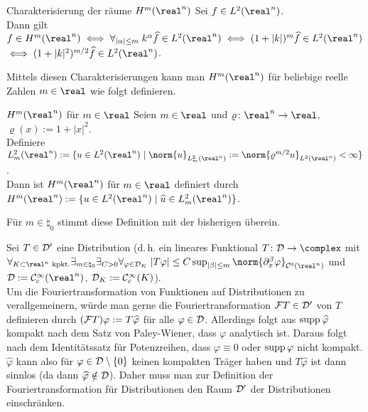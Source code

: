 \linie

\begin{Satz}{Charakterisierung der räume $H^m(\real^n)$}
    Sei $f \in L^2(\real^n)$.\\
    Dann gilt $f \in H^m(\real^n)
    \iff \forall_{|\alpha| \le m}\; k^\alpha \widehat{f} \in L^2(\real^n)
    \iff (1 + |k|)^m \widehat{f} \in L^2(\real^n)$\\
    $\iff (1 + |k|^2)^{m/2} \widehat{f} \in L^2(\real^n)$.
\end{Satz}

\begin{Bem}
    Mittels diesen Charakterisierungen kann man $H^m(\real^n)$ für beliebige reelle Zahlen
    $m \in \real$ wie folgt definieren.
\end{Bem}

\begin{Def}{$H^m(\real^n)$ für $m \in \real$}
    Seien $m \in \real$ und $\varrho\colon \real^n \rightarrow \real$, $\varrho(x) := 1 + |x|^2$.\\
    Definiere $L^2_m(\real^n) := \{u \in L^2(\real^n) \;|\;
    \norm{u}_{L^2_m(\real^n)} := \norm{\varrho^{m/2} u}_{L^2(\real^n)} < \infty\}$.\\
    Dann ist $H^m(\real^n)$ für $m \in \real$ definiert durch
    $H^m(\real^n) := \{u \in L^2(\real^n) \;|\; \widehat{u} \in L^2_m(\real^n)\}$.
\end{Def}

\begin{Bem}
    Für $m \in \natural_0$ stimmt diese Definition mit der bisherigen überein.
\end{Bem}

\linie

\begin{Bem}
    Sei $T \in \mathcal{D}'$ eine Distribution
    (d.\,h. ein lineares Funktional $T\colon \D \rightarrow \complex$ mit\\
    $\forall_{K \subset \real^n \text{ kpkt.}} \exists_{m \in \natural_0}
    \exists_{C > 0} \forall_{\varphi \in \D_K}\;
    |T\varphi| \le C \sup_{|\beta| \le m} \norm{\partial_x^\beta \varphi}_{\C^0(\real^n)}$
    und $\D := \C^\infty_c(\real^n)$, $\mathcal{D}_K := \mathcal{C}^\infty_c(K)$).\\
    Um die Fouriertransformation von Funktionen auf Distributionen zu verallgemeinern,
    würde man gerne die Fouriertransformation $\mathcal{F} T \in \mathcal{D}'$ von $T$ definieren durch
    $(\mathcal{F} T)\varphi := T \widehat{\varphi}$ für alle $\varphi \in \mathcal{D}$.
    Allerdings folgt aus $\operatorname{supp} \widehat{\varphi}$ kompakt
    nach dem Satz von Paley-Wiener, dass $\varphi$ analytisch ist.
    Daraus folgt nach dem Identitätssatz für Potenzreihen, dass $\varphi \equiv 0$ oder
    $\operatorname{supp} \varphi$ nicht kompakt.
    $\widehat{\varphi}$ kann also für $\varphi \in \mathcal{D} \setminus \{0\}$ keinen kompakten Träger
    haben und $T\widehat{\varphi}$ ist dann sinnlos (da dann $\widehat{\varphi} \notin \mathcal{D}$).
    Daher muss man zur Definition der Fouriertransformation für Distributionen den Raum
    $\mathcal{D}'$ der Distributionen einschränken.
\end{Bem}

